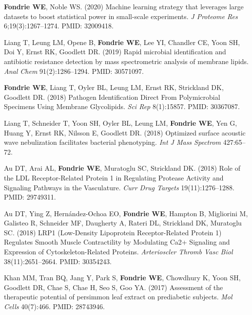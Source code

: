 \documentclass{article}
\begin{document}
\begin{etaremune}

  \item \textbf{Fondrie WE}, Noble WS. (2020) Machine learning strategy that
    leverages large datasets to boost statistical power in small-scale
    experiments. \textit{J Proteome Res} 6;19(3):1267--1274. PMID: 32009418.
  
  \item Liang T, Leung LM, Opene B, \textbf{Fondrie WE}, Lee YI, Chandler CE,
    Yoon SH, Doi Y, Ernst RK, Goodlett DR. (2019) Rapid microbial identification
    and antibiotic resistance detection by mass spectrometric analysis of
    membrane lipids. \textit{Anal Chem} 91(2):1286--1294. PMID: 30571097.

  \item \textbf{Fondrie WE}, Liang T, Oyler BL, Leung LM, Ernst RK, Strickland
    DK, Goodlett DR. (2018) Pathogen Identification Direct From Polymicrobial
    Specimens Using Membrane Glycolipids. \textit{Sci Rep} 8(1):15857. PMID:
    30367087.
    
  \item Liang T, Schneider T, Yoon SH, Oyler BL, Leung LM, \textbf{Fondrie WE},
    Yen G, Huang Y, Ernst RK, Nilsson E, Goodlett DR. (2018) Optimized surface
    acoustic wave nebulization facilitates bacterial phenotyping. \textit{Int J
      Mass Spectrom} 427:65--72.
    
  \item Au DT, Arai AL, \textbf{Fondrie WE}, Muratoglu SC, Strickland DK. (2018)
    Role of the LDL Receptor-Related Protein 1 in Regulating Protease Activity
    and Signaling Pathways in the Vasculature. \textit{Curr Drug Targets}
    19(11):1276--1288. PMID: 29749311.

  \item Au DT, Ying Z, Hernández-Ochoa EO, \textbf{Fondrie WE}, Hampton B,
    Migliorini M, Galisteo R, Schneider MF, Daugherty A, Rateri DL, Strickland
    DK, Muratoglu SC. (2018) LRP1 (Low-Density Lipoprotein Receptor-Related
    Protein 1) Regulates Smooth Muscle Contractility by Modulating Ca2+
    Signaling and Expression of Cytoskeleton-Related Proteins.
    \textit{Arterioscler Thromb Vasc Biol} 38(11):2651--2664. PMID: 30354243.
    
  \item Khan MM, Tran BQ, Jang Y, Park S, {\bf Fondrie WE}, Chowdhury K, Yoon
    SH, Goodlett DR, Chae S, Chae H, Seo S, Goo YA. (2017) Assessment of the
    therapeutic potential of persimmon leaf extract on prediabetic subjects.
    {\it Mol Cells} 40(7):466. PMID: 28743946.
    

\end{etaremune}
\end{document}
